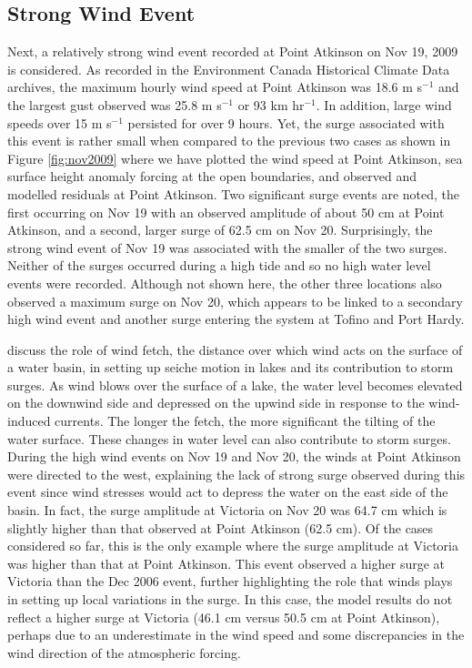\documentclass[pdftex,10pt]{article}
\begin{document}
\subsection{Strong Wind Event}
Next, a relatively strong wind event recorded at Point Atkinson on Nov 19, 2009 is considered. As recorded in the Environment Canada Historical Climate Data archives, the maximum hourly wind speed at Point Atkinson was 18.6 m s$^{-1}$ and the largest gust observed was 25.8 m s$^{-1}$ or 93 km hr$^{-1}$. In addition, large wind speeds over 15 m s$^{-1}$ persisted for over 9 hours. Yet, the surge associated with this event is rather small when compared to the previous two cases as shown in Figure \ref{fig:nov2009} where we have plotted the wind speed at Point Atkinson, sea surface height anomaly forcing at the open boundaries, and observed and modelled residuals at Point Atkinson. Two significant surge events are noted, the first occurring on Nov 19 with an observed amplitude of about 50 cm at Point Atkinson, and a second, larger surge of 62.5 cm on Nov 20. Surprisingly, the strong wind event of Nov 19 was associated with the smaller of the two surges. Neither of the surges occurred during a high tide and so no high water level events were recorded. Although not shown here, the other three locations also observed a maximum surge on Nov 20, which appears to be linked to a secondary high wind event and another surge entering the system at Tofino and Port Hardy. 

\citet{danard2003storm} discuss the role of wind fetch, the distance over which wind acts on the surface of a water basin, in setting up seiche motion in lakes and its contribution to storm surges. As wind blows over the surface of a lake, the water level becomes elevated on the downwind side and depressed on the upwind side in response to the wind-induced currents. The longer the fetch, the more significant the tilting of the water surface. These changes in water level can also contribute to storm surges.  During the high wind events on Nov 19 and Nov 20, the winds at Point Atkinson were directed to the west, explaining the lack of strong surge observed during this event since wind stresses would act to depress the water on the east side of the basin. In fact, the surge amplitude at Victoria on Nov 20 was 64.7 cm which is slightly higher than that observed at Point Atkinson (62.5 cm). Of the cases considered so far, this is the only example where the surge amplitude at Victoria was higher than that at Point Atkinson. This event observed a higher surge at Victoria than the Dec 2006 event, further highlighting the role that winds plays in setting up local variations in the surge. In this case, the model results do not reflect a higher surge at Victoria (46.1 cm versus 50.5 cm at Point Atkinson), perhaps due to an underestimate in the wind speed and some discrepancies in the wind direction of the atmospheric forcing.  
\end{document}
